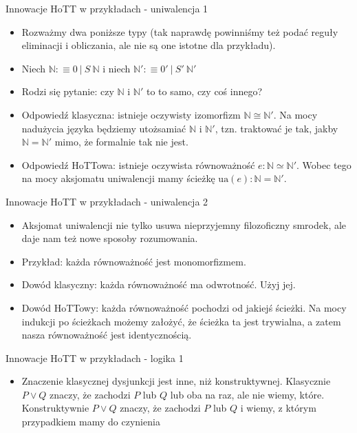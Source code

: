 \documentclass{beamer}
\begin{document}
\begin{frame}{Innowacje HoTT w przykładach - uniwalencja 1}
\begin{itemize}
	\item Rozważmy dwa poniższe typy (tak naprawdę powinniśmy też podać reguły eliminacji i obliczania, ale nie są one istotne dla przykładu).
	\item Niech $\mathbb{N} :\equiv 0 \: | \: S\ \mathbb{N}$ i niech $\mathbb{N}' :\equiv 0' \: | \: S'\ \mathbb{N}'$
	\item Rodzi się pytanie: czy $\mathbb{N}$ i $\mathbb{N}'$ to to samo, czy coś innego?
	\item Odpowiedź klasyczna: istnieje oczywisty izomorfizm $\mathbb{N} \cong \mathbb{N}'$. Na mocy nadużycia języka będziemy utożsamiać $\mathbb{N}$ i $\mathbb{N}'$, tzn. traktować je tak, jakby $\mathbb{N} = \mathbb{N}'$ mimo, że formalnie tak nie jest.
	\item Odpowiedź HoTTowa: istnieje oczywista równoważność $e : \mathbb{N} \simeq \mathbb{N}'$. Wobec tego na mocy aksjomatu uniwalencji mamy ścieżkę $\text{ua}(e) : \mathbb{N} = \mathbb{N}'$.
\end{itemize}
\end{frame}

\begin{frame}{Innowacje HoTT w przykładach - uniwalencja 2}
\begin{itemize}
	\item Aksjomat uniwalencji nie tylko usuwa nieprzyjemny filozoficzny smrodek, ale daje nam też nowe sposoby rozumowania.
	\item Przykład: każda równoważność jest monomorfizmem.
	\item Dowód klasyczny: każda równoważność ma odwrotność. Użyj jej.
	\item Dowód HoTTowy: każda równoważność pochodzi od jakiejś ścieżki. Na mocy indukcji po ścieżkach możemy założyć, że ścieżka ta jest trywialna, a zatem nasza równoważność jest identycznością.
\end{itemize}
\end{frame}

\begin{frame}{Innowacje HoTT w przykładach - logika 1}
\begin{itemize}
	\item Znaczenie klasycznej dysjunkcji jest inne, niż konstruktywnej. Klasycznie $P \lor Q$ znaczy, że zachodzi $P$ lub $Q$ lub oba na raz, ale nie wiemy, które. Konstruktywnie $P \lor Q$ znaczy, że zachodzi $P$ lub $Q$ i wiemy, z którym przypadkiem mamy do czynienia
\end{itemize}
\end{frame}
\end{document}
